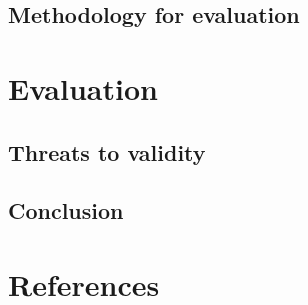 \documentclass[conference]{IEEEtran}
\begin{document}
\subsection{Methodology for evaluation}


\section{Evaluation}


\subsection{Threats to validity}


\subsection{Conclusion}

\section*{References}
\end{document}
